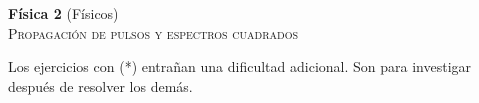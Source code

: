 \documentclass[11pt,spanish,a4paper]{article}
\begin{document}
\begin{center}
\textbf{Física 2} (Físicos) \hfill {}\\
	\textsc{\LARGE Propagación de pulsos y espectros cuadrados}
\end{center}

Los ejercicios con (*) entrañan una dificultad adicional. Son para investigar después de resolver los demás.




\begin{enumerate}


}



\end{enumerate}
\end{document}

